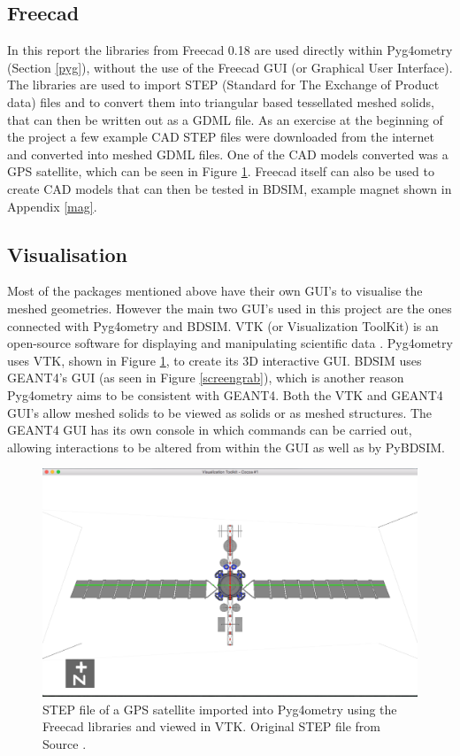 \documentclass[12pt,a4paper]{article}
\begin{document}
\subsection{Freecad}
In this report the libraries from Freecad 0.18 \cite{18} are used directly within Pyg4ometry (Section \ref{pyg}), without the use of the Freecad GUI (or Graphical User Interface). The libraries are used to import STEP (Standard for The Exchange of Product data) files and to convert them into triangular based tessellated meshed solids, that can then be written out as a GDML file. As an exercise at the beginning of the project a few example CAD STEP files were downloaded from the internet and converted into meshed GDML files. One of the CAD models converted was a GPS satellite, which can be seen in Figure \ref{sat}. Freecad itself can also be used to create CAD models that can then be tested in BDSIM, example magnet shown in Appendix \ref{mag}.

\subsection{Visualisation}
\label{vis}
Most of the packages mentioned above have their own GUI's to visualise the meshed geometries. However the main two GUI's used in this project are the ones connected with Pyg4ometry and BDSIM. VTK (or Visualization ToolKit) is an open-source software for displaying and manipulating scientific data \cite{vtk}. Pyg4ometry uses VTK, shown in Figure \ref{sat}, to create its 3D interactive GUI. BDSIM uses GEANT4's GUI (as seen in Figure \ref{screengrab}), which is another reason Pyg4ometry aims to be consistent with GEANT4. Both the VTK and GEANT4 GUI's allow meshed solids to be viewed as solids or as meshed structures. The GEANT4 GUI has its own console in which commands can be carried out, allowing interactions to be altered from within the GUI as well as by PyBDSIM.

\begin{figure}[h!]
\centering
\includegraphics[scale=0.4]{Images//VTK/sat.png}
\caption[width=\columnwidth]{STEP file of a GPS satellite imported into Pyg4ometry using the Freecad libraries and viewed in VTK. Original STEP file from Source \cite{sat}.}
\label{sat}
\end{figure}
\end{document}

